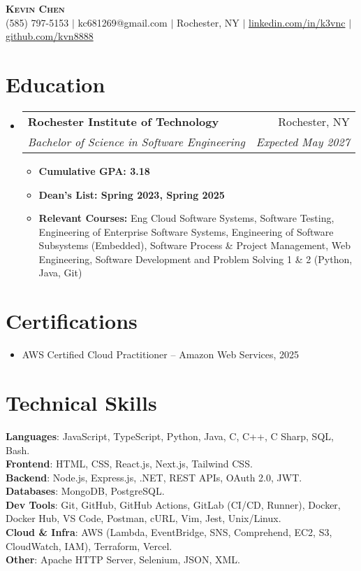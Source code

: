 \documentclass[letterpaper,11pt]{article}
\makeatletter
\newcommand{\resumeItem}[1]{
  \item\small{
    {#1 \vspace{-2pt}}
  }
}
\newcommand{\resumeSubheading}[4]{
  \vspace{-2pt}\item
    \begin{tabular*}{0.97\textwidth}[t]{l@{\extracolsep{\fill}}r}
      \textbf{#1} & #2 \\
      \textit{\small#3} & \textit{\small #4} \\
    \end{tabular*}\vspace{-7pt}
}
\newcommand{\resumeSubHeadingListStart}{\begin{itemize}[leftmargin=0.15in, label={}]}
\newcommand{\resumeSubHeadingListEnd}{\end{itemize}}
\newcommand{\resumeItemListStart}{\begin{itemize}}
\newcommand{\resumeItemListEnd}{\end{itemize}\vspace{-5pt}}
\makeatother
\begin{document}
\begin{center}
    \textbf{\Huge \scshape Kevin Chen} \\ \vspace{1pt}
    \small (585) 797-5153 $|$ kc681269@gmail.com $|$ Rochester, NY $|$ 
    \href{https://www.linkedin.com/in/k3vnc/}{linkedin.com/in/k3vnc} $|$ 
    \href{https://github.com/kvn8888}{github.com/kvn8888}
\end{center}

\section{Education}
  \resumeSubHeadingListStart
    \resumeSubheading
      {Rochester Institute of Technology}{Rochester, NY}
      {Bachelor of Science in Software Engineering}{Expected May 2027}
      \resumeItemListStart
        \resumeItem{\textbf{Cumulative GPA: 3.18}}
        \resumeItem{\textbf{Dean's List: Spring 2023, Spring 2025}}
        \resumeItem{\textbf{Relevant Courses:} Eng Cloud Software Systems, Software Testing, Engineering of Enterprise Software Systems, Engineering of Software Subsystems (Embedded), Software Process \& Project Management, Web Engineering, Software Development and Problem Solving 1 \& 2 (Python, Java, Git)}
      \resumeItemListEnd
  \resumeSubHeadingListEnd

\section{Certifications}
  \resumeSubHeadingListStart
    \resumeItem{AWS Certified Cloud Practitioner -- Amazon Web Services, 2025}
  \resumeSubHeadingListEnd

\section{Technical Skills}
\begin{itemize}[leftmargin=0.15in, label={}]
\small{\item{
\textbf{Languages}{: JavaScript, TypeScript, Python, Java, C, C++, C Sharp, SQL, Bash.} \\
\textbf{Frontend}{: HTML, CSS, React.js, Next.js, Tailwind CSS.} \\
\textbf{Backend}{: Node.js, Express.js, .NET, REST APIs, OAuth 2.0, JWT.} \\
\textbf{Databases}{: MongoDB, PostgreSQL.} \\
\textbf{Dev Tools}{: Git, GitHub, GitHub Actions, GitLab (CI/CD, Runner), Docker, Docker Hub, VS Code, Postman, cURL, Vim, Jest, Unix/Linux.} \\
\textbf{Cloud \& Infra}{: AWS (Lambda, EventBridge, SNS, Comprehend, EC2, S3, CloudWatch, IAM), Terraform, Vercel.} \\
\textbf{Other}{: Apache HTTP Server, Selenium, JSON, XML.}}}
\end{itemize}
\end{document}
